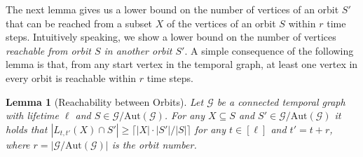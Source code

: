 \documentclass[10pt,a4paper]{article}
\newtheorem{lemma}{Lemma}[section]
\newcommand{\auttg}{\ensuremath{\text{Aut}(\mathcal{G})}}
\newcommand{\torb}{\ensuremath{\mathcal{G}/\auttg}}
\begin{document}
The next lemma gives us a lower bound on the number of vertices of an orbit $S'$
that can be reached from a subset $X$ of the vertices of an orbit $S$
{within $r$ time steps}. Intuitively speaking, we show a lower bound on the
number of vertices {\em reachable from orbit $S$ {in} another orbit $S'$}.
{A simple consequence of the following lemma is that, from any start vertex
in the temporal graph, at least one vertex in every orbit is reachable within
$r$ time steps.}

\begin{lemma}[Reachability between Orbits]\label{lem:laneorbit} Let
    $\mathcal{G}$ be a connected temporal graph with lifetime $\ell$ and $S \in
    \torb$. For any $X \subseteq S$ and $S' \in \torb$ it holds that $|L_{t,
    t'}(X) \cap S'| \geq  \lceil |X| \cdot |S'|/|S| \rceil$ for any $t \in
    [\ell]$ and $t'=t+r$, where $r=|\torb|$ is the orbit number.
\end{lemma}
\end{document}
